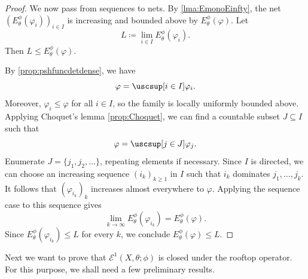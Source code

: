 \begin{proof}
    We now pass from sequences to nets. By \cref{lma:EmonoEinfty}, the net $(E_{\theta}^{\phi}(\varphi_i))_{i\in I}$ is increasing and bounded above by $E_{\theta}^{\phi}(\varphi)$. Let
    \[
        L\coloneqq \lim_{i\in I}E_{\theta}^{\phi}(\varphi_i).
    \]
    Then $L\leq E_{\theta}^{\phi}(\varphi)$.

    By \cref{prop:pshfuncdetdense}, we have
    \[
        \varphi=\uscsup[i\in I]\varphi_i.
    \]
    Moreover, $\varphi_i\leq \varphi$ for all $i\in I$, so the family is locally uniformly bounded above.
    Applying Choquet's lemma \cref{prop:Choquet}, we can find a countable subset $J\subseteq I$ such that
    \[
        \varphi=\uscsup[j\in J]\varphi_j.
    \]
    Enumerate $J=\{j_1,j_2,\ldots\}$, repeating elements if necessary. Since $I$ is directed, we can choose an increasing sequence $(i_k)_{k\geq 1}$ in $I$ such that $i_k$ dominates $j_1,\ldots,j_k$. It follows that $(\varphi_{i_k})_k$ increases almost everywhere to $\varphi$. Applying the sequence case to this sequence gives
    \[
        \lim_{k\to\infty}E_{\theta}^{\phi}(\varphi_{i_k})=E_{\theta}^{\phi}(\varphi).
    \]
    Since $E_{\theta}^{\phi}(\varphi_{i_k})\leq L$ for every $k$, we conclude $E_{\theta}^{\phi}(\varphi)\leq L$.
\end{proof}

Next we want to prove that $\mathcal{E}^1(X,\theta;\phi)$ is closed under the rooftop operator. For this purpose, we shall need a few preliminary results.

